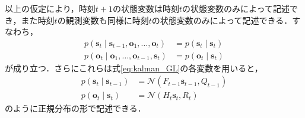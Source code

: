     以上の仮定により，時刻$t+1$の状態変数は時刻$t$の状態変数のみによって記述でき，また時刻$t$の観測変数も同様に時刻$t$の状態変数のみによって記述できる．すなわち，
    \begin{equation}
        \label{eq:kalman_with_markov}
        \begin{aligned}
            p(\bm{s}_{t} \mid \bm{s}_{t-1}, \bm{o}_1, \dots, \bm{o}_t) &= p(\bm{s}_t \mid \bm{s}_t)
            \\p(\bm{o}_t \mid \bm{o}_1, \dots, \bm{o}_{t-1}, \bm{s}_t) &= p(\bm{o}_t \mid \bm{s}_t)
        \end{aligned}
    \end{equation}
    が成り立つ．さらにこれらは式\ref{eq:kalman_GL}の各変数を用いると，
    \begin{equation}
        \label{eq:linear_transition_and_observation}
        \begin{aligned}
            p(\bm{s}_t \mid \bm{s}_{t-1}) &= \mathcal{N}(F_{t-1} \bm{s}_{t-1}, Q_{t-1})
            \\ p(\bm{o}_t \mid \bm{s}_t) &= \mathcal{N}(H_t \bm{s}_{t}, R_t)
        \end{aligned}
    \end{equation}
    のように正規分布の形で記述できる．

